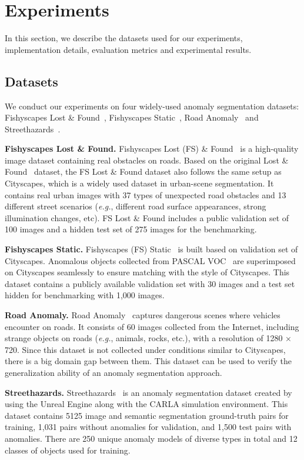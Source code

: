 \documentclass[10pt,twocolumn,letterpaper]{article}
\begin{document}
\section{Experiments}

In this section, we describe the datasets used for our experiments, implementation details, evaluation metrics and experimental results.
\subsection{Datasets}
We conduct our experiments on four widely-used anomaly segmentation datasets: Fishyscapes Lost \& Found~\cite{fishyscapes}, Fishyscapes Static~\cite{fishyscapes}, Road Anomaly~\cite{imgr} and Streethazards~\cite{streethazards}.

\label{sec:lf}
\noindent\textbf{Fishyscapes Lost \& Found.} Fishyscapes Lost (FS) \& Found~\cite{fishyscapes} is a high-quality image dataset containing real obstacles on roads. Based on the original Lost \& Found~\cite{l_f} dataset, the FS Lost \& Found dataset also follows the same setup as Cityscapes\cite{cityscapes}, which is a widely used dataset in urban-scene segmentation. It contains real urban images with 37 types of unexpected road obstacles and 13 different street scenarios (\emph{e.g.}, different road surface appearances, strong illumination changes, etc). FS Lost \& Found includes a public validation set of 100 images and a hidden test set of 275 images for the benchmarking.

\label{sec:static}
\noindent\textbf{Fishyscapes Static.} Fishyscapes (FS) Static~\cite{fishyscapes} is built based on validation set of Cityscapes\cite{cityscapes}. Anomalous objects collected from PASCAL VOC~\cite{voc} are superimposed on Cityscapes seamlessly to ensure matching with the style of Cityscapes. This dataset contains a publicly available validation set with 30 images and a test set hidden for benchmarking with 1,000 images.

\label{sec:ra}
\noindent\textbf{Road Anomaly.} Road Anomaly~\cite{imgr} captures dangerous scenes where vehicles encounter on roads. It consists of 60 images collected from the Internet, including strange objects on roads (\emph{e.g.}, animals, rocks, etc.), with a resolution of 1280 × 720. Since this dataset is not collected under conditions similar to Cityscapes, there is a big domain gap between them. This dataset can be used to verify the generalization ability of an anomaly segmentation approach.

\label{sec:streethazards}
\noindent\textbf{Streethazards.} Streethazards~\cite{streethazards} is an anomaly segmentation dataset created by using the Unreal Engine along with the CARLA simulation environment. This dataset contains 5125 image and semantic segmentation ground-truth pairs for training, 1,031 pairs without anomalies for validation, and 1,500 test pairs with anomalies. There are 250 unique anomaly models of diverse types in total and 12 classes of objects used for training.
\end{document}
